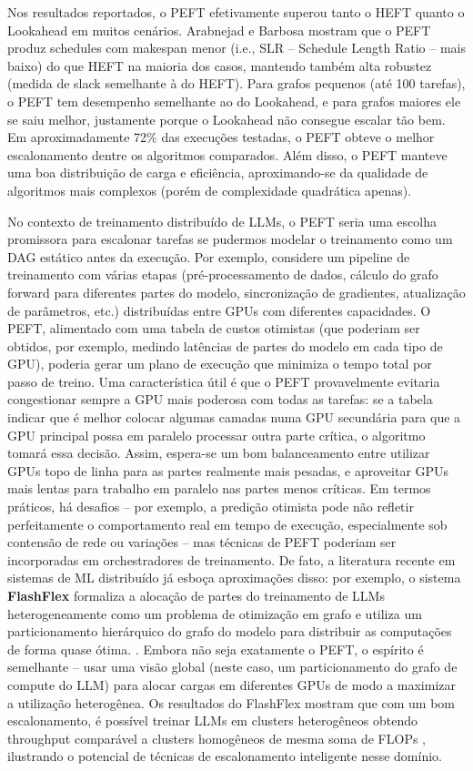 \documentclass[12pt, %
openright, 
oneside, %
a4paper,    %
brazil]{facom-ufu-abntex2}
\begin{document}
Nos resultados reportados, o PEFT efetivamente superou tanto o HEFT quanto o Lookahead em muitos
cenários. Arabnejad e Barbosa mostram que o PEFT produz schedules com makespan menor (i.e., SLR –
Schedule Length Ratio – mais baixo) do que HEFT na maioria dos casos, mantendo também alta robustez
(medida de slack semelhante à do HEFT)\cite{arabnejad2013list}.  Para grafos pequenos (até 100 tarefas), o PEFT tem
desempenho semelhante ao do Lookahead, e para grafos maiores ele se saiu melhor, justamente
porque o Lookahead não consegue escalar tão bem\cite{arabnejad2013list}.  Em aproximadamente 72\% das execuções testadas, o PEFT obteve o melhor escalonamento dentre os algoritmos comparados\cite{arabnejad2013list}. Além disso, o
PEFT manteve uma boa distribuição de carga e eficiência, aproximando-se da qualidade de algoritmos
mais complexos (porém de complexidade quadrática apenas)\cite{arabnejad2013list}.

No contexto de treinamento distribuído de LLMs, o PEFT seria uma escolha promissora para escalonar
tarefas se pudermos modelar o treinamento como um DAG estático antes da execução. Por exemplo,
considere um pipeline de treinamento com várias etapas (pré-processamento de dados, cálculo do
grafo forward para diferentes partes do modelo, sincronização de gradientes, atualização de
parâmetros, etc.) distribuídas entre GPUs com diferentes capacidades. O PEFT, alimentado com uma
tabela de custos otimistas (que poderiam ser obtidos, por exemplo, medindo latências de partes do
modelo em cada tipo de GPU), poderia gerar um plano de execução que minimiza o tempo total por
passo de treino. Uma característica útil é que o PEFT provavelmente evitaria congestionar sempre a
GPU mais poderosa com todas as tarefas: se a tabela indicar que é melhor colocar algumas camadas
numa GPU secundária para que a GPU principal possa em paralelo processar outra parte crítica, o
algoritmo tomará essa decisão. Assim, espera-se um bom balanceamento entre utilizar GPUs topo de
linha para as partes realmente mais pesadas, e aproveitar GPUs mais lentas para trabalho em paralelo
nas partes menos críticas. Em termos práticos, há desafios – por exemplo, a predição otimista pode não
refletir perfeitamente o comportamento real em tempo de execução, especialmente sob contensão de
rede ou variações – mas técnicas de PEFT poderiam ser incorporadas em orchestradores de
treinamento. De fato, a literatura recente em sistemas de ML distribuído já esboça aproximações disso:
por exemplo, o sistema \textbf{FlashFlex} \cite{yan2024flashflex} formaliza a alocação de partes do treinamento de
LLMs heterogeneamente como um problema de otimização em grafo e utiliza um particionamento
hierárquico do grafo do modelo para distribuir as computações de forma quase ótima\cite{yan2024flashflex}. . Embora
não seja exatamente o PEFT, o espírito é semelhante – usar uma visão global (neste caso, um
particionamento do grafo de compute do LLM) para alocar cargas em diferentes GPUs de modo a
maximizar a utilização heterogênea. Os resultados do FlashFlex mostram que com um bom
escalonamento, é possível treinar LLMs em clusters heterogêneos obtendo throughput comparável a
clusters homogêneos de mesma soma de FLOPs\cite{yan2024flashflex}
, ilustrando o potencial de técnicas de
escalonamento inteligente nesse domínio.
\end{document}
